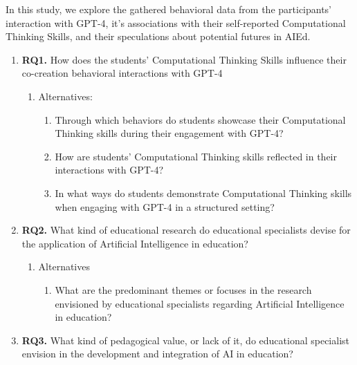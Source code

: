 \documentclass[sn-mathphys, Numbered]{sn-jnl}%
\theoremstyle{thmstyleone}%
\theoremstyle{thmstyletwo}%
\theoremstyle{thmstylethree}%
\begin{document}

In this study, we explore the gathered behavioral data from the participants' interaction with GPT-4, it's associations with their self-reported Computational Thinking Skills, and their speculations about potential futures in AIEd.
\begin{enumerate}
    \item[] \textbf{RQ1.} How does the students' Computational Thinking Skills influence their co-creation behavioral interactions with GPT-4
    \begin{enumerate}
        \item[] Alternatives:
        \begin{enumerate}
            \item  Through which behaviors do students showcase their Computational Thinking skills during their engagement with GPT-4?
            \item How are students' Computational Thinking skills reflected in their interactions with GPT-4? 
            \item In what ways do students demonstrate Computational Thinking skills when engaging with GPT-4 in a structured setting? 
        \end{enumerate}
    \end{enumerate}
    \item[] \textbf{RQ2.} What kind of educational research do educational specialists devise for the application of Artificial Intelligence in education?
    \begin{enumerate}
        \item[] Alternatives
        \begin{enumerate}
            \item What are the predominant themes or focuses in the research envisioned by educational specialists regarding Artificial Intelligence in education? 
        \end{enumerate}
    \end{enumerate}
    \item [] \textbf{RQ3.} What kind of pedagogical value, or lack of it, do educational specialist envision in the development and integration of AI in education?

\end{enumerate}
\end{document}

